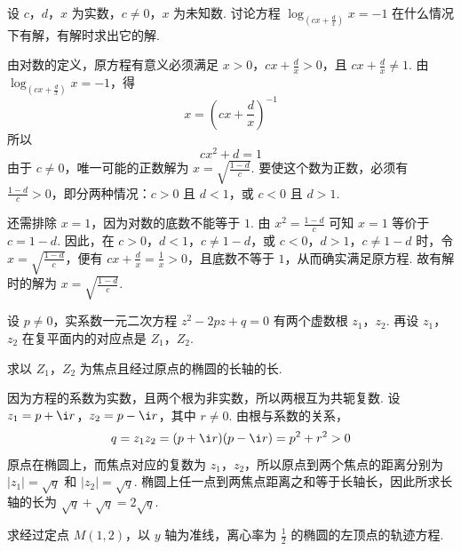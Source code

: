 \documentclass[UTF8,a4paper,oneside,11pt]{ctexbook}
\begin{document}
\begin{problem}

设 \(c\)，\(d\)，\(x\) 为实数，\(c \neq 0\)，\(x\) 为未知数. 讨论方程 \(\log_{\left(cx + \frac{d}{x}\right)} x = -1\) 在什么情况下有解，有解时求出它的解.
\end{problem}

\begin{solution}
由对数的定义，原方程有意义必须满足 \(x>0\)，\(cx+\frac{d}{x}>0\)，且 \(cx+\frac{d}{x}\neq1\). 由 \(\log_{\left(cx+\frac{d}{x}\right)}x=-1\)，得
\[
x=\left(cx+\frac{d}{x}\right)^{-1}
\]
所以
\[
cx^2+d=1
\]
由于 \(c\neq0\)，唯一可能的正数解为 \(x=\sqrt{\frac{1-d}{c}}\). 要使这个数为正数，必须有 \(\frac{1-d}{c}>0\)，即分两种情况：\(c>0\) 且 \(d<1\)，或 \(c<0\) 且 \(d>1\).

还需排除 \(x=1\)，因为对数的底数不能等于 \(1\). 由 \(x^2=\frac{1-d}{c}\) 可知 \(x=1\) 等价于 \(c=1-d\). 因此，在 \(c>0\)，\(d<1\)，\(c\neq1-d\)，或 \(c<0\)，\(d>1\)，\(c\neq1-d\) 时，令 \(x=\sqrt{\frac{1-d}{c}}\)，便有 \(cx+\frac{d}{x}=\frac{1}{x}>0\)，且底数不等于 \(1\)，从而确实满足原方程. 故有解时的解为 \(x=\sqrt{\frac{1-d}{c}}\).
\end{solution}

\begin{problem}

设 \(p \neq 0\)，实系数一元二次方程 \(z^2 - 2pz + q = 0\) 有两个虚数根 \(z_1\)，\(z_2\). 再设 \(z_1\)，\(z_2\) 在复平面内的对应点是 \(Z_1\)，\(Z_2\).

求以 \(Z_1\)，\(Z_2\) 为焦点且经过原点的椭圆的长轴的长.
\end{problem}

\begin{solution}
因为方程的系数为实数，且两个根为非实数，所以两根互为共轭复数. 设 \(z_1=p+\i r\)，\(z_2=p-\i r\)，其中 \(r\neq0\). 由根与系数的关系，
\[
q=z_1z_2=(p+\i r)(p-\i r)=p^2+r^2>0
\]
原点在椭圆上，而焦点对应的复数为 \(z_1\)，\(z_2\)，所以原点到两个焦点的距离分别为 \(\lvert z_1\rvert=\sqrt{q}\) 和 \(\lvert z_2\rvert=\sqrt{q}\). 椭圆上任一点到两焦点距离之和等于长轴长，因此所求长轴的长为 \(\sqrt q+\sqrt q=2\sqrt q\).
\end{solution}

\begin{problem}

求经过定点 \(M\left(1,2\right)\)，以 \(y\) 轴为准线，离心率为 \(\frac{1}{2}\) 的椭圆的左顶点的轨迹方程.
\end{problem}
\end{document}
